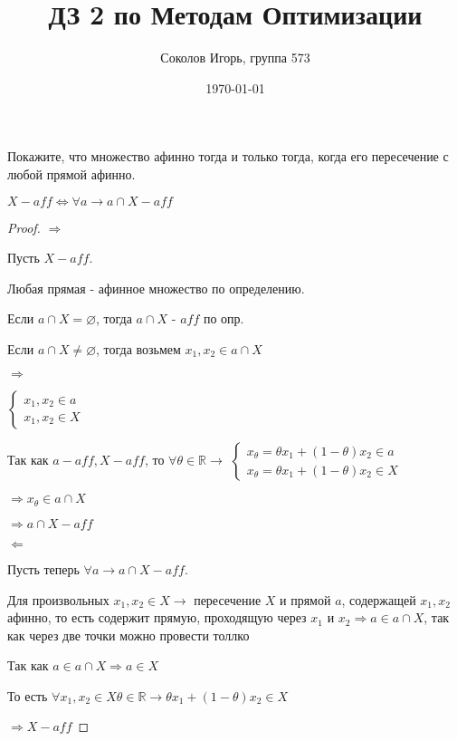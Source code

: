\documentclass[a4paper,12pt]{article}
\author{Соколов Игорь, группа 573}
\title{ДЗ 2 по Методам Оптимизации}
\date{\today}
\begin{document}

\maketitle

\section{}

Покажите, что множество афинно тогда и только тогда, когда его пересечение с любой прямой афинно.

$X - aff \Leftrightarrow \forall a \rightarrow a\cap X - aff$

\begin{proof}
	
	\vspace{\baselineskip}
	
	$\Longrightarrow$
	
	Пусть $X - aff$.
	
	Любая прямая  - афинное множество по определению.
	
	Если $a\cap X = \varnothing$, тогда $a\cap X$ - $aff$ по опр.
	
	Если $a\cap X \neq \varnothing$, тогда возьмем $x_1, x_2 \in a\cap X $

	$\Rightarrow $

	$\begin{cases}
	x_1, x_2 \in a\\
	x_1, x_2 \in X\end{cases}
	$
	
	Так как $a - aff, X - aff$, то $\forall \theta \in \mathbb{R} \rightarrow $
	$\begin{cases} 
	x_{\theta} = \theta x_1+(1-\theta)x_2 \in a\\
	x_{\theta} = \theta x_1+(1-\theta)x_2 \in X
	\end{cases}
	$ 
	
	$\Rightarrow x_{\theta} \in a\cap X$
	
	$\Rightarrow a\cap X - aff$

	\vspace{\baselineskip}
	
	$\Longleftarrow$
		
	Пусть теперь $\forall a \rightarrow a\cap X - aff$. 
	
	Для произвольных $x_1,x_2 \in X \rightarrow$ пересечение $X$ и прямой $a$, содержащей $x_1,x_2$ афинно, то есть содержит прямую, проходящую через $x_1$ и $x_2 \Rightarrow a \in a\cap X$, так как через две точки можно провести толлко \pagestyle{plain} %
	
	Так как $a \in a\cap X \Rightarrow a \in X$
	
	То есть $\forall x_1,x_2 \in X \theta \in \mathbb{R}  \rightarrow \theta x_1+(1-\theta)x_2 \in X$
	
	$\Rightarrow X - aff$
\end{proof}
\end{document}

